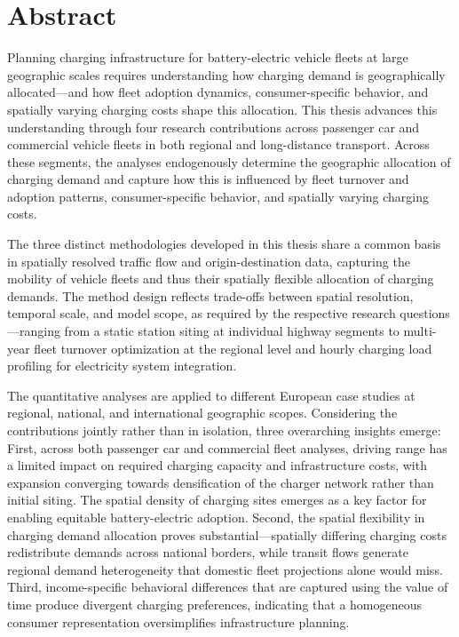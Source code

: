 \chapter*{Abstract}
Planning charging infrastructure for battery-electric vehicle fleets at large geographic scales requires understanding how charging demand is geographically allocated---and how fleet adoption dynamics, consumer-specific behavior, and spatially varying charging costs shape this allocation. This thesis advances this understanding through four research contributions across passenger car and commercial vehicle fleets in both regional and long-distance transport. Across these segments, the analyses endogenously determine the geographic allocation of charging demand and capture how this is influenced by fleet turnover and adoption patterns, consumer-specific behavior, and spatially varying charging costs.

The three distinct methodologies developed in this thesis share a common basis in spatially resolved traffic flow and origin-destination data, capturing the mobility of vehicle fleets and thus their spatially flexible allocation of charging demands. The method design reflects trade-offs between spatial resolution, temporal scale, and model scope, as required by the respective research questions---ranging from a static station siting at individual highway segments to multi-year fleet turnover optimization at the regional level and hourly charging load profiling for electricity system integration.

The quantitative analyses are applied to different European case studies at regional, national, and international geographic scopes. Considering the contributions jointly rather than in isolation, three overarching insights emerge: First, across both passenger car and commercial fleet analyses, driving range has a limited impact on required charging capacity and infrastructure costs, with expansion converging towards densification of the charger network rather than initial siting. The spatial density of charging sites emerges as a key factor for enabling equitable battery-electric adoption. Second, the spatial flexibility in charging demand allocation proves substantial---spatially differing charging costs redistribute demands across national borders, while transit flows generate regional demand heterogeneity that domestic fleet projections alone would miss. Third, income-specific behavioral differences that are captured using the value of time produce divergent charging preferences, indicating that a homogeneous consumer representation oversimplifies infrastructure planning.

